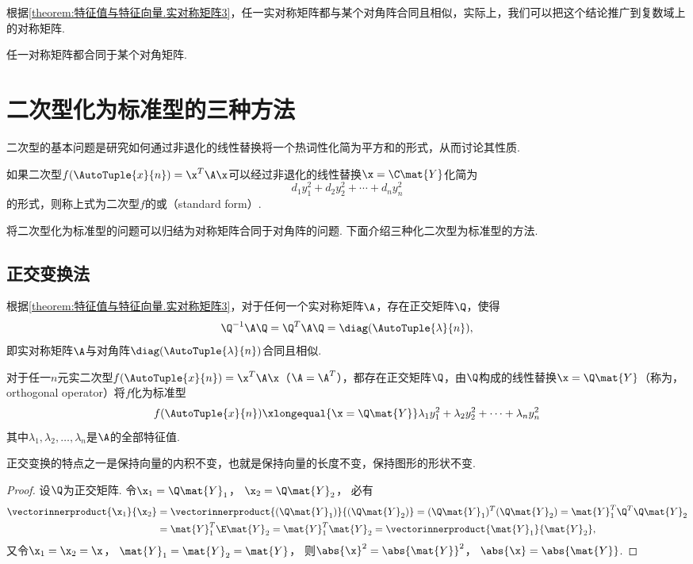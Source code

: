 根据\cref{theorem:特征值与特征向量.实对称矩阵3}，任一实对称矩阵都与某个对角阵合同且相似，实际上，我们可以把这个结论推广到复数域上的对称矩阵.
\begin{theorem}
任一对称矩阵都合同于某个对角矩阵.
\end{theorem}

\section{二次型化为标准型的三种方法}
二次型的基本问题是研究如何通过非退化的线性替换将一个热词性化简为平方和的形式，从而讨论其性质.
\begin{definition}
如果二次型\(f(\AutoTuple{x}{n})=\x^T\A\x\)可以经过非退化的线性替换\(\x=\C\mat{Y}\)化简为\[
d_1 y_1^2 + d_2 y_2^2 + \dotsb + d_n y_n^2
\]的形式，则称上式为二次型\(f\)的或（standard form）.
\end{definition}
将二次型化为标准型的问题可以归结为对称矩阵合同于对角阵的问题.
下面介绍三种化二次型为标准型的方法.

\subsection{正交变换法}
根据\cref{theorem:特征值与特征向量.实对称矩阵3}，对于任何一个实对称矩阵\(\A\)，存在正交矩阵\(\Q\)，使得\[
\Q^{-1}\A\Q = \Q^T\A\Q = \diag(\AutoTuple{\lambda}{n}),
\]即实对称矩阵\(\A\)与对角阵\(\diag(\AutoTuple{\lambda}{n})\)合同且相似.

\begin{theorem}
对于任一\(n\)元实二次型\(f(\AutoTuple{x}{n})=\x^T\A\x\)（\(\A=\A^T\)），都存在正交矩阵\(\Q\)，由\(\Q\)构成的线性替换\(\x=\Q\mat{Y}\)（称为，{\rm orthogonal operator}）将\(f\)化为标准型\[
f(\AutoTuple{x}{n})
\xlongequal{\x=\Q\mat{Y}}
\lambda_1y_1^2+\lambda_2y_2^2+ \dotsb +\lambda_ny_n^2
\]其中\(\lambda_1,\lambda_2,\dotsc,\lambda_n\)是\(\A\)的全部特征值.
\end{theorem}

\begin{corollary}
正交变换的特点之一是保持向量的内积不变，也就是保持向量的长度不变，保持图形的形状不变.
\begin{proof}
设\(\Q\)为正交矩阵.
令\(\x_1=\Q\mat{Y}_1\)，%
\(\x_2=\Q\mat{Y}_2\)，%
必有\begin{align*}
\vectorinnerproduct{\x_1}{\x_2}
&=\vectorinnerproduct{(\Q\mat{Y}_1)}{(\Q\mat{Y}_2)}
=(\Q\mat{Y}_1)^T (\Q\mat{Y}_2)
=\mat{Y}_1^T \Q^T \Q \mat{Y}_2 \\
&=\mat{Y}_1^T \E \mat{Y}_2
=\mat{Y}_1^T \mat{Y}_2
=\vectorinnerproduct{\mat{Y}_1}{\mat{Y}_2},
\end{align*}
又令\(\x_1=\x_2=\x\)，%
\(\mat{Y}_1=\mat{Y}_2=\mat{Y}\)，%
则\(\abs{\x}^2=\abs{\mat{Y}}^2\)，%
\(\abs{\x}=\abs{\mat{Y}}\).
\end{proof}
\end{corollary}

